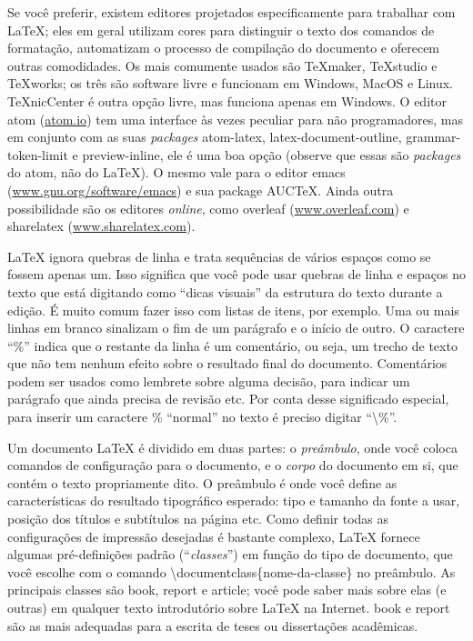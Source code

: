 Se você preferir, existem editores projetados especificamente para trabalhar
com \LaTeX{}; eles em geral utilizam cores para distinguir o texto dos
comandos de formatação, automatizam o processo de compilação do documento e
oferecem outras comodidades. Os mais comumente usados são \TeX{}maker,
\TeX{}studio e \TeX{}works; os três são software livre e funcionam em
Windows, MacOS e Linux. \TeX{}nicCenter é outra opção livre, mas funciona
apenas em Windows. O editor atom (\url{atom.io}) tem uma interface às vezes
peculiar para não programadores, mas em conjunto com as suas \emph{packages}
\textsf{atom-latex}, \textsf{latex-document-outline},
\textsf{grammar-token-limit} e \textsf{preview-inline}, ele é uma boa opção
(observe que essas são \emph{packages} do atom, não do \LaTeX{}). O mesmo
vale para o editor emacs (\url{www.gnu.org/software/emacs}) e sua package
\textsf{AUC\TeX{}}. Ainda outra possibilidade são os editores \emph{online},
como overleaf (\url{www.overleaf.com}) e sharelatex (\url{www.sharelatex.com}).

\LaTeX{} ignora quebras de linha e trata sequências de vários espaços como
se fossem apenas um. Isso significa que você pode usar quebras de linha e
espaços no texto que está digitando como ``dicas visuais'' da estrutura do
texto durante a edição. É muito comum fazer isso com listas de itens, por
exemplo. Uma ou mais linhas em branco sinalizam o fim de um parágrafo e o
início de outro. O caractere ``\%'' indica que o restante da linha é um
comentário, ou seja, um trecho de texto que não tem nenhum efeito sobre o
resultado final do documento. Comentários podem ser usados como lembrete sobre
alguma decisão, para indicar um parágrafo que ainda precisa de revisão etc.
Por conta desse significado especial, para inserir um caractere \% ``normal''
no texto é preciso digitar ``\textsf{\textbackslash\%}''.

Um documento \LaTeX{} é dividido em duas partes: o \emph{preâmbulo}, onde
você coloca comandos de configuração para o documento, e o \emph{corpo} do
documento em si, que contém o texto propriamente dito. O preâmbulo é onde
você define as características do resultado tipográfico esperado: tipo e
tamanho da fonte a usar, posição dos títulos e subtítulos na página etc.
Como definir todas as configurações de impressão desejadas é bastante complexo,
\LaTeX{} fornece algumas pré-definições padrão (``\textit{classes}'') em
função do tipo de documento, que você escolhe com o comando
\textsf{\textbackslash{}documentclass\{nome-da-classe\}} no preâmbulo. As
principais classes são \textsf{book}, \textsf{report} e \textsf{article};
você pode saber mais sobre elas (e outras) em qualquer texto introdutório
sobre \LaTeX{} na Internet. \textsf{book} e \textsf{report} são as mais
adequadas para a escrita de teses ou dissertações acadêmicas.

